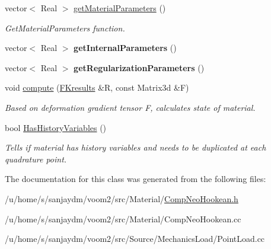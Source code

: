 \begin{DoxyCompactItemize}
\item 
\hypertarget{classvoom_1_1_comp_neo_hookean_a6b003412bbe4fdad93b104087d653553}{
vector$<$ Real $>$ \hyperlink{classvoom_1_1_comp_neo_hookean_a6b003412bbe4fdad93b104087d653553}{getMaterialParameters} ()}
\label{classvoom_1_1_comp_neo_hookean_a6b003412bbe4fdad93b104087d653553}

\begin{DoxyCompactList}\small\item\em GetMaterialParameters function. \item\end{DoxyCompactList}\item 
\hypertarget{classvoom_1_1_comp_neo_hookean_a3aec2497fa4680ed5ea3c59b8751a974}{
vector$<$ Real $>$ {\bfseries getInternalParameters} ()}
\label{classvoom_1_1_comp_neo_hookean_a3aec2497fa4680ed5ea3c59b8751a974}

\item 
\hypertarget{classvoom_1_1_comp_neo_hookean_a2e9e63896e3d00313ee65646fa867995}{
vector$<$ Real $>$ {\bfseries getRegularizationParameters} ()}
\label{classvoom_1_1_comp_neo_hookean_a2e9e63896e3d00313ee65646fa867995}

\item 
\hypertarget{classvoom_1_1_comp_neo_hookean_a0d6615827d8b6ba17f11879739b1524e}{
void \hyperlink{classvoom_1_1_comp_neo_hookean_a0d6615827d8b6ba17f11879739b1524e}{compute} (\hyperlink{structvoom_1_1_mechanics_material_1_1_f_kresults}{FKresults} \&R, const Matrix3d \&F)}
\label{classvoom_1_1_comp_neo_hookean_a0d6615827d8b6ba17f11879739b1524e}

\begin{DoxyCompactList}\small\item\em Based on deformation gradient tensor F, calculates state of material. \item\end{DoxyCompactList}\item 
\hypertarget{classvoom_1_1_comp_neo_hookean_a18903df0e0c9aba1a810d04904d9a287}{
bool \hyperlink{classvoom_1_1_comp_neo_hookean_a18903df0e0c9aba1a810d04904d9a287}{HasHistoryVariables} ()}
\label{classvoom_1_1_comp_neo_hookean_a18903df0e0c9aba1a810d04904d9a287}

\begin{DoxyCompactList}\small\item\em Tells if material has history variables and needs to be duplicated at each quadrature point. \item\end{DoxyCompactList}\end{DoxyCompactItemize}


The documentation for this class was generated from the following files:\begin{DoxyCompactItemize}
\item 
/u/home/s/sanjaydm/voom2/src/Material/\hyperlink{_comp_neo_hookean_8h}{CompNeoHookean.h}\item 
/u/home/s/sanjaydm/voom2/src/Material/CompNeoHookean.cc\item 
/u/home/s/sanjaydm/voom2/src/Source/MechanicsLoad/PointLoad.cc\end{DoxyCompactItemize}

